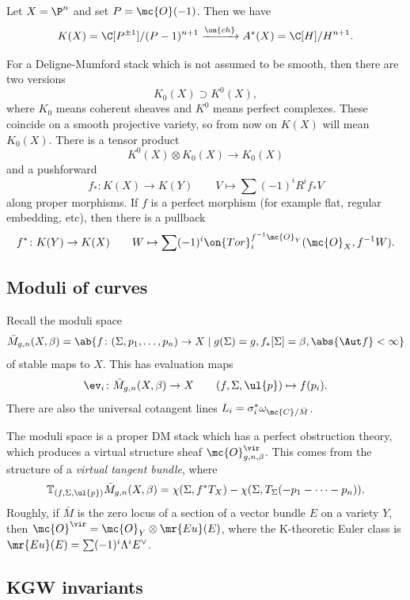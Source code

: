 \begin{exm}
    Let \(X = \P^n\) and set \(P = \mc{O}(-1)\). Then we have
    \[ K(X) = \C[P^{\pm 1}]/(P-1)^{n+1} \xrightarrow{\on{ch}} A^*(X) = \C[H]/H^{n+1}. \]
\end{exm}

For a Deligne-Mumford stack which is not assumed to be smooth, then there are two versions
\[ K_0(X) \supset K^0(X), \]
where \(K_0\) means coherent sheaves and \(K^0\) means perfect complexes. These coincide on a smooth projective variety, so from now on \(K(X)\) will mean \(K_0(X)\). There is a tensor product
\[ K^0(X) \otimes K_0(X) \to K_0(X) \]
and a pushforward
\[ f_* \colon K(X) \to K(Y) \qquad V \mapsto \sum (-1)^i R^i f_* V \]
along proper morphisms. If \(f\) is a perfect morphism (for example flat, regular embedding, etc), then there is a pullback
\[ f^* \colon K(Y) \to K(X) \qquad W \mapsto \sum (-1)^i \on{Tor}_i^{f^{-1} \mc{O}_Y} (\mc{O}_X, f^{-1} W). \]

\subsection{Moduli of curves}%
\label{sub:Moduli of curves}

Recall the moduli space
\[ \bar{M}_{g,n}(X, \beta) = \ab\{ f \colon (\Sigma, p_1, \ldots, p_n) \to X \mid g(\Sigma) = g, f_*[\Sigma] = \beta, \abs{\Aut f} < \infty \} \]
of stable maps to \(X\). This has evaluation maps
\[ \ev_i \colon \bar{M}_{g,n}(X, \beta) \to X \qquad (f, \Sigma, \ul{p}) \mapsto f(p_i). \]
There are also the universal cotangent lines \(L_i = \sigma_i^* \omega_{ \mc{C}/\bar{M} }\).

The moduli space is a proper DM stack which has a perfect obstruction theory, which produces a virtual structure sheaf \(\mc{O}^{\vir}_{g,n,\beta}\). This comes from the structure of a \textit{virtual tangent bundle}, where
\[ \mathbb{T}_{(f, \Sigma, \ul{p})} \bar{M}_{g,n}(X, \beta) = \chi(\Sigma, f^* T_X) - \chi(\Sigma, T_{\Sigma}(-p_1 - \cdots - p_n)). \]
Roughly, if \(\bar{M}\) is the zero locus of a section of a vector bundle \(E\) on a variety \(Y\), then \(\mc{O}^{\vir} = \mc{O}_Y \otimes \mr{Eu}(E)\), where the K-theoretic Euler class is \(\mr{Eu}(E) = \sum (-1)^i \Lambda^i E^{\vee}\).

\subsection{KGW invariants}%
\label{sub:KGW invariants}

